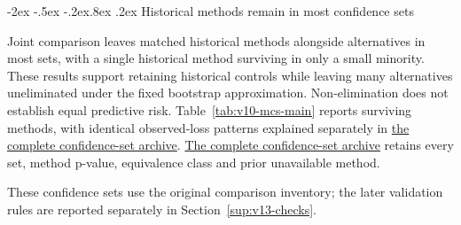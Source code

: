 \documentclass[10pt,a4paper]{article}
\makeatletter
\renewcommand\section{\@startsection{section}{1}{\z@}%
  {-2ex \@plus -.5ex \@minus -.2ex}{.8ex \@plus .2ex}%
  {\normalfont\large\bfseries}}
\makeatother
\begin{document}
\section{Historical methods remain in most confidence sets}\label{sup:v10-mcs}\label{sup:v13-mcs}

Joint comparison leaves matched historical methods alongside alternatives in most sets, with a single historical method surviving in only a small minority. These results support retaining historical controls while leaving many alternatives uneliminated under the fixed bootstrap approximation. Non-elimination does not establish equal predictive risk. Table~\ref{tab:v10-mcs-main} reports surviving methods, with identical observed-loss patterns explained separately in \href{https://github.com/ByronLi0207/financial-mathematics-paper-20261020/blob/submission-final/EXTENDED_RESULTS.md#asmbi-extended-s31}{the complete confidence-set archive}. \href{https://github.com/ByronLi0207/financial-mathematics-paper-20261020/blob/submission-final/EXTENDED_RESULTS.md#asmbi-extended-s31}{The complete confidence-set archive} retains every set, method p-value, equivalence class and prior unavailable method.

These confidence sets use the original comparison inventory; the later validation rules are reported separately in Section~\ref{sup:v13-checks}.
\end{document}
